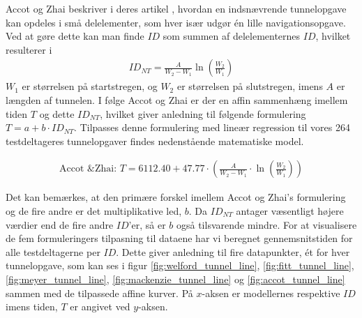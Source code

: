 Accot og Zhai beskriver i deres artikel \cite{accot1997}, hvordan en indsnævrende tunnelopgave kan opdeles i små delelementer, som hver især udgør én lille navigationsopgave. Ved at gøre dette kan man finde $ID$ som summen af delelementernes $ID$, hvilket resulterer i 
\begin{align*}
ID_{NT} = \frac{A}{W_2-W_1}\ln\left(\frac{W_2}{W_1}\right)
\end{align*}
$W_1$ er størrelsen på startstregen, og $W_2$ er størrelsen på slutstregen, imens $A$ er længden af tunnelen. I følge Accot og Zhai er der en affin sammenhæng imellem tiden $T$ og dette $ID_{NT}$, hvilket giver anledning til følgende formulering $T = a+b\cdot ID_{NT}$. Tilpasses denne formulering med lineær regression til vores 264 testdeltageres tunnelopgaver findes nedenstående matematiske model.

\begin{align*}
\text{Accot \& Zhai: } T = 6112.40+47.77 \cdot \left(\frac{A}{W_2-W_1}\cdot\ln\left(\frac{W_2}{W_1 }\right)\right)
\end{align*}

Det kan bemærkes, at den primære forskel imellem Accot og Zhai's formulering og de fire andre er det multiplikative led, $b$. Da $ID_{NT}$ antager væsentligt højere værdier end de fire andre $ID$'er, så er $b$ også tilsvarende mindre. For at visualisere de fem formuleringers tilpasning til dataene har vi beregnet gennemsnitstiden for alle testdeltagerne per $ID$. Dette giver anledning til fire datapunkter, ét for hver tunnelopgave, som kan ses i figur \ref{fig:welford_tunnel_line}, \ref{fig:fitt_tunnel_line}, \ref{fig:meyer_tunnel_line}, \ref{fig:mackenzie_tunnel_line} og \ref{fig:accot_tunnel_line} sammen med de tilpassede affine kurver. På $x$-aksen er modellernes respektive $ID$ imens tiden, $T$ er angivet ved $y$-aksen. 

